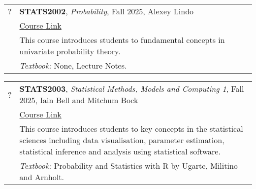 \documentclass[12pt]{article}
\begin{document}
\begin{itemize}[leftmargin = *]
        \begin{tabularx}{\textwidth}{@{}lX@{}}
            ? & \textbf{STATS2002}, \textit{Probability}, Fall 2025,   Alexey Lindo
            \\
            &
            \href{https://www.gla.ac.uk/coursecatalogue/course/?code=STATS2002}{Course Link} \\
            &
This course introduces students to fundamental concepts in univariate probability theory.            \\
            & \textit{Textbook:}  None, Lecture Notes.
        \end{tabularx}

        \begin{tabularx}{\textwidth}{@{}lX@{}}
             ? & \textbf{STATS2003}, \textit{Statistical Methods, Models and Computing 1}, Fall 2025, Iain Bell and Mitchum Bock
            \\
            &
            \href{https://www.gla.ac.uk/coursecatalogue/course/?code=STATS2003}{Course Link} \\
            &
           This course introduces students to key concepts in the statistical sciences including data visualisation, parameter estimation, statistical inference and analysis using statistical software.\\
            & \textit{Textbook:}  Probability and Statistics with R by Ugarte, Militino and Arnholt.
        \end{tabularx}


\end{itemize}

\end{document}
